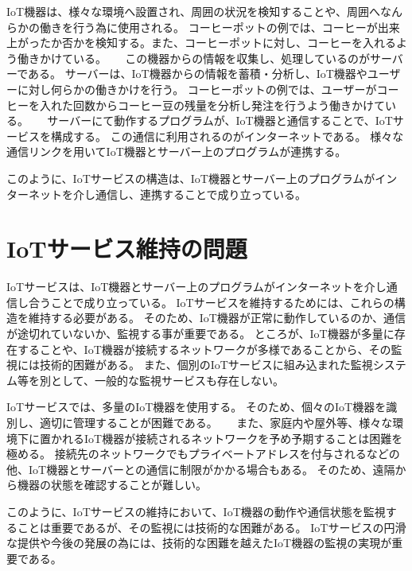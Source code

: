 IoT機器は、様々な環境へ設置され、周囲の状況を検知することや、周囲へなんらかの働きを行う為に使用される。
コーヒーポットの例では、コーヒーが出来上がったか否かを検知する。また、コーヒーポットに対し、コーヒーを入れるよう働きかけている。
\medskip
　
この機器からの情報を収集し、処理しているのがサーバーである。
サーバーは、IoT機器からの情報を蓄積・分析し、IoT機器やユーザーに対し何らかの働きかけを行う。
コーヒーポットの例では、ユーザーがコーヒーを入れた回数からコーヒー豆の残量を分析し発注を行うよう働きかけている。
\medskip
　
サーバーにて動作するプログラムが、IoT機器と通信することで、IoTサービスを構成する。
この通信に利用されるのがインターネットである。
様々な通信リンクを用いてIoT機器とサーバー上のプログラムが連携する。
\medskip

このように、IoTサービスの構造は、IoT機器とサーバー上のプログラムがインターネットを介し通信し、連携することで成り立っている。

\section{IoTサービス維持の問題}
IoTサービスは、IoT機器とサーバー上のプログラムがインターネットを介し通信し合うことで成り立っている。
IoTサービスを維持するためには、これらの構造を維持する必要がある。
そのため、IoT機器が正常に動作しているのか、通信が途切れていないか、監視する事が重要である。
ところが、IoT機器が多量に存在することや、IoT機器が接続するネットワークが多様であることから、その監視には技術的困難がある。
また、個別のIoTサービスに組み込まれた監視システム等を別として、一般的な監視サービスも存在しない。
\medskip

IoTサービスでは、多量のIoT機器を使用する。
そのため、個々のIoT機器を識別し、適切に管理することが困難である。
\medskip
　
また、家庭内や屋外等、様々な環境下に置かれるIoT機器が接続されるネットワークを予め予期することは困難を極める。
接続先のネットワークでもプライベートアドレスを付与されるなどの他、IoT機器とサーバーとの通信に制限がかかる場合もある。
そのため、遠隔から機器の状態を確認することが難しい。
\medskip

このように、IoTサービスの維持において、IoT機器の動作や通信状態を監視することは重要であるが、その監視には技術的な困難がある。
IoTサービスの円滑な提供や今後の発展の為には、技術的な困難を越えたIoT機器の監視の実現が重要である。



